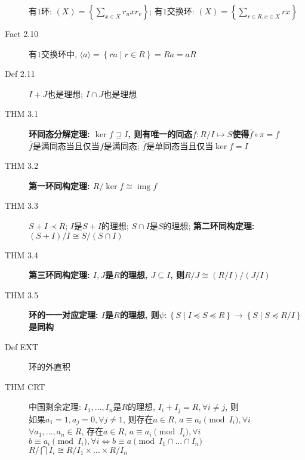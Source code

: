 \documentclass{article}
\renewcommand{\l}{\left}
\renewcommand{\r}{\right}
\newcommand{\img}{\operatorname{img}}
\begin{document}
\begin{description}
            有$1$环: $(X) = \l\{ \sum\limits_{x \in X} r_uxr_v\r\}$;
            有$1$交换环: $(X) = \l\{ \sum\limits_{r \in R, x \in X} rx \r\}$
        \item[Fact 2.10] 有$1$交换环中, $\langle a \rangle = \l\{ ra \mid r \in R\r\} = Ra = aR$
        \item[Def 2.11] $I+J$也是理想; $I \cap J$也是理想
        \item[THM 3.1] \textbf{环同态分解定理: $\ker f \supseteq I$, 则有唯一的同态$\overline f : R/I \mapsto S$使得$\overline f \circ \pi = f$}\\
            $\overline f$是满同态当且仅当$f$是满同态; $\overline f$是单同态当且仅当$\ker f = I$
        \item[THM 3.2] \textbf{第一环同构定理: $R/\ker f \cong \img f$}
        \item[THM 3.3] $S+I \prec R$; $I$是$S+I$的理想; $S\cap I$是$S$的理想; \textbf{第二环同构定理: $(S+I)/I \cong S/(S \cap I)$}
        \item[THM 3.4] \textbf{第三环同构定理: $I, J$是$R$的理想, $J \subseteq I$, 则$R/J \cong (R/I)/(J/I)$}
        \item[THM 3.5] \textbf{环的一一对应定理: $I$是$R$的理想, 则$\psi : \l\{ S \mid I \preceq S \preceq R\r\} \to \l\{ S \mid S \preceq R/I \r\}$是同构}
        \item[Def EXT] 环的外直积
        \item[THM CRT] 中国剩余定理: $I_1, \dots, I_n$是$R$的理想, $I_i + I_j = R, \forall i \ne j$, 则\\
            如果$a_1 = 1, a_j = 0, \forall j \ne 1$, 则存在$a \in R$, $a \equiv a_i \pmod {I_i}, \forall i$\\
            $\forall a_1, \dots, a_n \in R$, 存在$a \in R$, $a \equiv a_i \pmod {I_i}, \forall i$\\
            $b \equiv a_i \pmod {I_i}, \forall i \iff b \equiv a \pmod{I_1 \cap \dots \cap I_n}$\\
            $R / \bigcap I_i \cong R/I_1 \times \dots \times R/I_n$
    \end{description}
\end{document}
